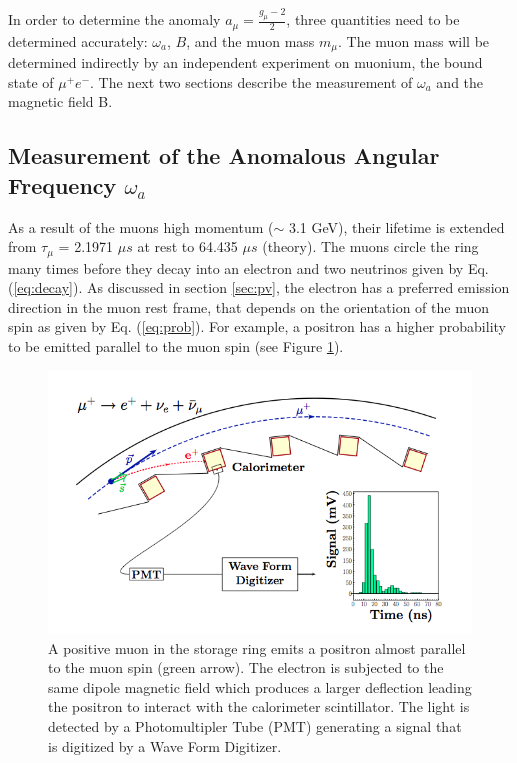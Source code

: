 \documentclass{outhesis}
\begin{document}
In order to determine the anomaly $a_{\mu} = \frac{g_{\mu}-2}{2}$, three quantities need to be determined accurately: $\omega_a$, $B$, and the muon mass $m_{\mu}$. The muon mass will be determined indirectly by an independent experiment on muonium, the bound state of $\mu^+e^-$. The next two sections describe the measurement of $\omega_a$ and the magnetic field B.

\subsection{Measurement of the Anomalous Angular Frequency $\omega_a$}

As a result of the muons high momentum ($\sim$ 3.1 GeV), their lifetime is extended from $\tau_{\mu}$ = 2.1971 $\mu s$ at rest to 64.435 $\mu s$ (theory). The muons circle the ring many times before they decay into an electron and two neutrinos given by Eq. (\ref{eq:decay}). As discussed in section \ref{sec:pv}, the electron has a preferred emission direction in the muon rest frame, that depends on the orientation of the muon spin as given by Eq. (\ref{eq:prob}). For example, a positron has a higher probability to be emitted parallel to the muon spin (see Figure \ref{fig:det}). 
\begin{figure}
  \centering
  \includegraphics[scale=0.5]{figures/detection}
  \caption{A positive muon in the storage ring emits a positron almost parallel to the muon spin (green arrow). The electron is subjected to the same dipole magnetic field which produces a larger deflection leading the positron to interact with the calorimeter scintillator. The light is detected by a Photomultipler Tube (PMT) generating a signal that is digitized by a Wave Form Digitizer. \cite{phen}}
  \label{fig:det}
\end{figure}
\end{document}
